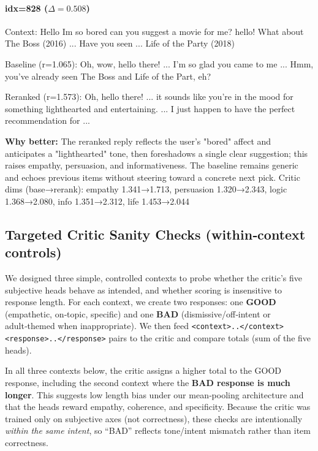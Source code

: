 \documentclass[12pt]{article}
\begin{document}
\newline
\newline

\paragraph{idx=828 ($\Delta=0.508$)}
  \begin{center}
  \begin{qexample}
  Context: Hello Im so bored can you suggest a movie for me? hello! What about The Boss (2016) ... Have you seen ... Life of the Party (2018)
  
  Baseline (r=1.065): Oh, wow, hello there! ... I'm so glad you came to me ... Hmm, you've already seen The Boss and Life of the Part, eh?
  
  Reranked (r=1.573): Oh, hello there! ... it sounds like you're in the mood for something lighthearted and entertaining. ... I just happen to have the perfect recommendation for ...
  \end{qexample}
  \end{center}
  \textbf{Why better:} The reranked reply reflects the user's "bored" affect and anticipates a "lighthearted" tone, then foreshadows a single clear suggestion; this raises empathy, persuasion, and informativeness. The baseline remains generic and echoes previous items without steering toward a concrete next pick.
  Critic dims (base→rerank): empathy 1.341→1.713, persuasion 1.320→2.343, logic 1.368→2.080, info 1.351→2.312, life 1.453→2.044

  
  \subsection{Targeted Critic Sanity Checks (within‑context controls)}
  \label{sec:critic_sanity_checks}
   We designed three simple, controlled contexts to probe whether the critic's five subjective heads behave as intended, and whether scoring is insensitive to response length. For each context, we create two responses: one \textbf{GOOD} (empathetic, on‑topic, specific) and one \textbf{BAD} (dismissive/off‑intent or adult‑themed when inappropriate). We then feed
   \newline
   \texttt{<context>..</context><response>..</response>} pairs to the critic and compare totals (sum of the five heads).

  In all three contexts below, the critic assigns a higher total to the GOOD response, including the second context where the \textbf{BAD response is much longer}. This suggests low length bias under our mean‑pooling architecture and that the heads reward empathy, coherence, and specificity. Because the critic was trained only on subjective axes (not correctness), these checks are intentionally \emph{within the same intent}, so ``BAD'' reflects tone/intent mismatch rather than item correctness.
\end{document}
